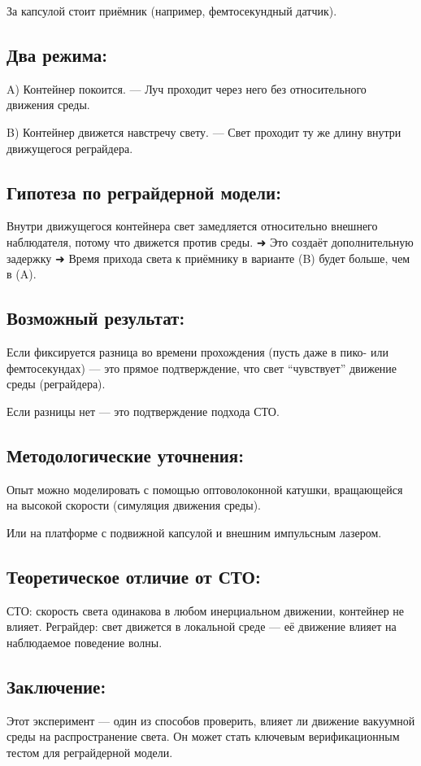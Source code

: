 \documentclass[12pt]{article}
\begin{document}
За капсулой стоит приёмник (например, фемтосекундный датчик).


\subsection*{Два режима:}
\par
A) Контейнер покоится.
— Луч проходит через него без относительного движения среды.
\par
B) Контейнер движется навстречу свету.
— Свет проходит ту же длину внутри движущегося реграйдера.

\subsection*{Гипотеза по реграйдерной модели:}
Внутри движущегося контейнера свет замедляется относительно внешнего наблюдателя, потому что движется против среды.
➜ Это создаёт дополнительную задержку
➜ Время прихода света к приёмнику в варианте (B) будет больше, чем в (A).

\subsection*{Возможный результат:}
Если фиксируется разница во времени прохождения (пусть даже в пико- или фемтосекундах) — это прямое подтверждение, что свет “чувствует” движение среды (реграйдера).

Если разницы нет — это подтверждение подхода СТО.

\subsection*{Методологические уточнения:}
Опыт можно моделировать с помощью оптоволоконной катушки, вращающейся на высокой скорости (симуляция движения среды).

Или на платформе с подвижной капсулой и внешним импульсным лазером.

\subsection*{Теоретическое отличие от СТО:}
СТО: скорость света одинакова в любом инерциальном движении, контейнер не влияет.
Реграйдер: свет движется в локальной среде — её движение влияет на наблюдаемое поведение волны.

\subsection*{Заключение:}
Этот эксперимент — один из способов проверить, влияет ли движение вакуумной среды на распространение света.
Он может стать ключевым верификационным тестом для реграйдерной модели.
\end{document}
